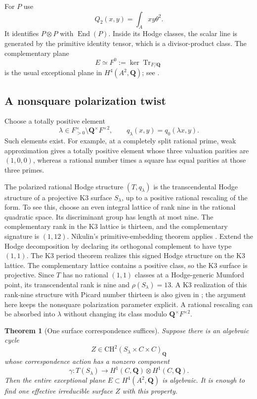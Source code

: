 \documentclass[11pt]{article}
\newtheorem{theorem}{Theorem}[section]
\theoremstyle{definition}
\theoremstyle{remark}
\begin{document}
For $P$ use
\[
 Q_2(x,y)=\int_Axy\theta^2.
\]
It identifies $P\otimes P$ with $\operatorname{End}(P)$.  Inside its
Hodge classes, the scalar line is generated by the primitive identity
tensor, which is a divisor-product class.  The complementary plane
\[
 E\simeq F^0:=\ker\operatorname{Tr}_{F/\mathbf Q}
\]
is the usual exceptional plane in $H^4(A^2,\mathbf Q)$; see
\cite[Propositions 4.1--4.2]{Galluzzi}.

\subsection{A nonsquare polarization twist}

Choose a totally positive element
\[
 \lambda\in F^\times_{>0}\setminus\mathbf Q^\times F^{\times2},
 \qquad q_\lambda(x,y)=q_0(\lambda x,y).
\]
Such elements exist.  For example, at a completely split rational prime,
weak approximation gives a totally positive element whose three
valuation parities are $(1,0,0)$, whereas a rational number times a
square has equal parities at those three primes.

The polarized rational Hodge structure $(T,q_\lambda)$ is the
transcendental Hodge structure of a projective K3 surface $S_\lambda$,
up to a positive rational rescaling of the form.  To see this, choose
an even integral lattice of rank nine in the rational quadratic space.
Its discriminant group has length at most nine.  The complementary rank
in the K3 lattice is thirteen, and the complementary signature is
$(1,12)$.  Nikulin's primitive-embedding theorem applies
\cite[Theorem~1.12.4, pp.~122--123]{Nikulin}. Extend the Hodge decomposition by declaring its orthogonal complement to have type $(1,1)$. The K3 period theorem \cite[Theorem~1.7, p.~109]{MorrisonK3} realizes this signed Hodge structure on the K3 lattice.  The complementary lattice
contains a positive class, so the K3 surface is projective.  Since $T$
has no rational $(1,1)$ classes at a Hodge-generic Mumford point, its
transcendental rank is nine and $\rho(S_\lambda)=13$.
A K3 realization of this rank-nine structure with Picard number
thirteen is also given in
\cite[Appendix~A, Theorem~A23]{BBK3Sixfolds}; the argument here
keeps the nonsquare polarization parameter explicit.
A rational rescaling can be absorbed into $\lambda$ without changing
its class modulo $\mathbf Q^\times F^{\times2}$.

\begin{theorem}[One surface correspondence suffices]\label{thm:mumford-surface}
Suppose there is an algebraic cycle
\[
 Z\in\mathrm{CH}^2(S_\lambda\times C\times C)_{\mathbf Q}
\]
whose correspondence action has a nonzero component
\begin{equation}
 \gamma:T(S_\lambda)\longrightarrow
              H^1(C,\mathbf Q)\otimes H^1(C,\mathbf Q).
 \label{eq:mumford-surface-map}
\end{equation}
Then the entire exceptional plane $E\subset H^4(A^2,\mathbf Q)$ is
algebraic.  It is enough to find one effective irreducible surface $Z$
with this property.
\end{theorem}
\end{document}
